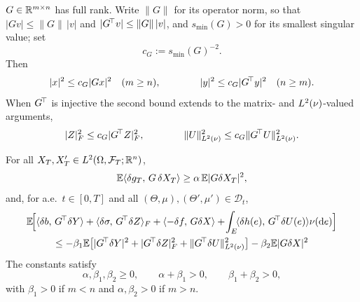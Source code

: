 \begin{assumption}\label{ass:G}
$G\in\mathbb{R}^{m\times n}$ has full rank. Write $\|G\|$ for its operator norm, so that
$|Gv|\le\|G\|\,|v|$ and $|G^{\!\top} v|\le\|G\|\,|v|$, and $s_{\min}(G)>0$ for its
smallest singular value; set
\[
c_G:=s_{\min}(G)^{-2} .
\]
Then
\[
|x|^2\le c_G|Gx|^2\quad(m\ge n),
\qquad\qquad
|y|^2\le c_G|G^{\!\top} y|^2\quad(n\ge m).
\]
When $G^{\!\top}$ is injective the second bound extends to the matrix- and $L^2(\nu)$-valued
arguments,
\[
|Z|_F^2\le c_G|G^{\!\top} Z|_F^2,
\qquad\qquad
\lVert U\rVert_{L^2(\nu)}^2\le c_G\lVert G^{\!\top} U\rVert_{L^2(\nu)}^2 .
\]
\end{assumption}
\begin{assumption}\label{ass:mono}
For all $X_T,X'_T\in L^2(\Omega,\mathcal{F}_T;\mathbb{R}^n)$,
\[
\mathbb{E}\langle \delta g_T,\,G\,\delta X_T\rangle\ge\alpha\,\mathbb{E}|G\delta X_T|^2,
\]
and, for a.e.\ $t\in[0,T]$ and all $(\Theta,\mu),(\Theta',\mu')\in\mathcal D_t$,
\begin{multline}\label{eq:mono}
\E\!\Big[\inner{\delta b}{\Gstar\delta Y}+\inner{\delta\sigma}{\Gstar\delta Z}_F
+\inner{-\delta f}{G\delta X}+\!\int_E\!\inner{\delta h(e)}{\Gstar\delta U(e)}\nu(\diff e)\Big]\\
\le-\beta_1\E\big[|\Gstar\delta Y|^2+|\Gstar\delta Z|_F^2+\Lnorm{\Gstar\delta U}^2\big]-\beta_2\E|G\delta X|^2
\end{multline}
The constants satisfy
\[
\alpha,\beta_1,\beta_2\ge0,\qquad \alpha+\beta_1>0,\qquad \beta_1+\beta_2>0,
\]
with $\beta_1>0$ if $m<n$ and $\alpha,\beta_2>0$ if $m>n$.
\end{assumption}
